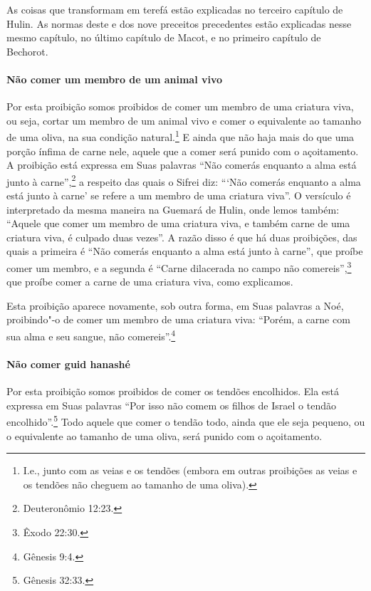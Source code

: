 \begin{multicols}{2}
As coisas que transformam em terefá\starr{} estão explicadas no terceiro
capítulo de Hulin\starr. As normas deste e dos nove preceitos precedentes
estão explicadas nesse mesmo capítulo, no último capítulo de Macot\starr, e no
primeiro capítulo de Bechorot\starr.

\paragraph{Não comer um membro de um animal vivo}

Por esta proibição somos proibidos de comer um membro de uma criatura
viva, ou seja, cortar um membro de um animal vivo e comer o equivalente
ao tamanho de uma oliva, na sua condição natural.\footnote{I.e., junto com as veias e os tendões (embora em outras proibições as
  veias e os tendões não cheguem ao tamanho de uma oliva).}
E ainda que não haja mais do que uma porção ínfima de carne nele, aquele
que a comer será punido com o açoitamento. A proibição está expressa em
Suas palavras ``Não comerás enquanto a alma está junto à carne'',\footnote{Deuteronômio 12:23.} a respeito das quais o Sifrei\starr{} diz: ```Não comerás
enquanto a alma está junto à carne' se refere a um membro de uma
criatura viva''. O versículo é interpretado da mesma maneira na Guemará\starr{}
de Hulin\starr, onde lemos também: ``Aquele que comer um membro de uma criatura viva, e também carne de uma criatura
viva, é culpado duas vezes''. A razão disso é que há duas proibições,
das quais a primeira é ``Não comerás enquanto a alma está junto à
carne'', que proíbe comer um membro, e a segunda é ``Carne dilacerada no
campo não comereis'',\footnote{Êxodo 22:30.} que proíbe comer a carne de uma
criatura viva, como explicamos.

Esta proibição aparece novamente, sob outra forma, em Suas palavras a
Noé, proibindo"-o de comer um membro de uma criatura viva: ``Porém, a
carne com sua alma e seu sangue, não comereis''.\footnote{Gênesis 9:4.}

\paragraph{Não comer guid hanashé\starr}

Por esta proibição somos proibidos de comer os tendões encolhidos. Ela
está expressa em Suas palavras ``Por isso não comem os filhos de Israel
o tendão encolhido''.\footnote{Gênesis 32:33.} Todo aquele que comer o tendão
todo, ainda que ele seja pequeno, ou o equivalente ao tamanho de uma
oliva, será punido com o açoitamento.


\end{multicols}
